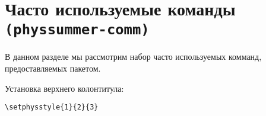 \section{Часто используемые команды \texttt{(physsummer-comm)}}

В данном разделе мы рассмотрим набор часто используемых комманд, предоставляемых пакетом.

Установка верхнего колонтитула:

\begin{lstlisting}[keepspaces, extendedchars = \true, gobble = 3]
    \setphysstyle{1}{2}{3}
\end{lstlisting}


